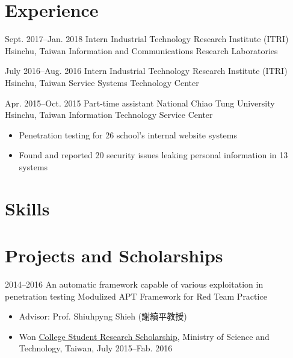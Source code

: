 \documentclass[11pt,a4paper,sans,english]{moderncv}
\begin{document}
\vspace{-5pt}
\section{Experience}
    \cventry
        {Sept. 2017--Jan. 2018} %
        {Intern} %
        {Industrial Technology Research Institute (ITRI)} %
        {Hsinchu, Taiwan} %
        {Information and Communications Research Laboratories} %
        {} %

    \cventry
        {July 2016--Aug. 2016}
        {Intern}
        {Industrial Technology Research Institute (ITRI)}
        {Hsinchu, Taiwan}
        {Service Systems Technology Center}
        {}
        
    \cventry
        {Apr. 2015--Oct. 2015}
        {Part-time assistant}
        {National Chiao Tung University}
        {Hsinchu, Taiwan}
        {Information Technology Service Center}
        {\begin{itemize}
        \item Penetration testing for 26 school's internal website systems
        \item Found and reported 20 security issues leaking personal information in 13 systems
        \end{itemize}}
        
\section{Skills}
        
\section{Projects and Scholarships}
    \cventry
        {2014--2016} %
        {An automatic framework capable of various exploitation in penetration testing} %
        {Modulized APT Framework for Red Team Practice} %
        {}
        {} %
        {\begin{itemize}
        \item Advisor: Prof. Shiuhpyng Shieh ({謝續平教授})
        \item Won \underline{College Student Research Scholarship}, Ministry of Science and Technology, Taiwan, July 2015--Fab. 2016
        \end{itemize}}
        
\end{document}
